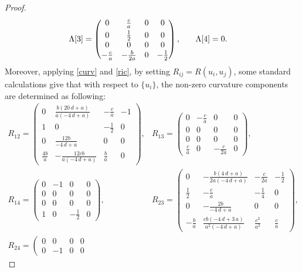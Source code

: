 \documentclass[11pt,oneside,leqno]{amsart}
\theoremstyle{plain}
\begin{document}
\begin{proof}
{\begin{align}
\Lambda[3]=\begin{pmatrix}
0 & \frac{c}{a} & 0 & 0 \\ \noalign{\smallskip} 0 & \frac 12 & 0 & 0 \\ 0 & 0 & 0 & 0 \\ -\frac{c}{a} & -\frac{b}{2a} &  0 & -\frac 12 \end{pmatrix}, \qquad &\Lambda[4]=0. \notag
\end{align}}
Moreover, applying \eqref{curv} and \eqref{ric}, by setting $R_{ij}=R(u_i,u_j)$, some standard calculations give that with respect to $\{u_i\}$, the non-zero curvature components are determined as following:
$$
\begin{array}{ll}
R_{12}=\left( \begin {array}{cccc} 0&{\frac {b \left( 20\,d+a \right) }{a
 \left( -4\,d+a \right) }}&-{\frac {c}{a}}&-1\\ 1&0&
-\frac{1}{2}&0\\ 0&{\frac {12b}{-4\,d+a}}&0&0
\\[2pt] {\frac {4b}{a}}&-{\frac {12cb}{a \left( -4\,d
+a \right) }}&{\frac {b}{a}}&0\end {array} \right),&
R_{13}=\left( \begin {array}{cccc} 0&-{\frac {c}{a}}&0&0
\\ 0&0&0&0\\ 0&0&0&0
\\ {\frac {c}{a}}&0&-{\frac {c}{2a}}&0
\end {array} \right),\\[20pt]
R_{14}=\left( \begin {array}{cccc} 0&-1&0&0\\ 0&0&0&0
\\ 0&0&0&0\\ 1&0&-\frac{1}{2}&0
\end {array} \right),&
R_{23}=\left( \begin {array}{cccc} 0&-{\frac {b \left( 4\,d+a \right) }
{2a \left( -4\,d+a \right) }}&-{\frac {c}{2a}}&-\frac{1}{2}
\\ \frac{1}{2}&-{\frac {c}{a}}&-\frac{1}{4}&0\\[2pt] 0&
-{\frac {2b}{-4\,d+a}}&0&0\\[2pt] -{\frac {b}{a}}&{
\frac {cb \left( -4\,d+3\,a \right) }{{a}^{2} \left( -4\,d+a \right) }
}&{\frac {{c}^{2}}{{a}^{2}}}&{\frac {c}{a}}\end {array} \right),\\[20pt]
R_{24}=\left( \begin {array}{cccc} 0&0&0&0\\ 0&-1&0&0

\end{array}
\end{array}$$
\end{proof}
\end{document}
